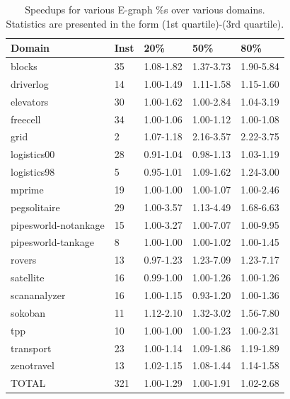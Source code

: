 \documentclass[letterpaper]{article}
\begin{document}
\begin{table}
	\begin{center}
	    \begin{tabular}{| l | l | l | l | l |}
	    \hline
	    Domain & Inst & 20\% & 50\% & 80\%
	    \\ \hline
	    blocks & 35 & 1.08-1.82 & 1.37-3.73 & 1.90-5.84
	    \\ \hline
	    driverlog & 14 & 1.00-1.49 & 1.11-1.58 & 1.15-1.60
	    \\ \hline
	    elevators & 30 & 1.00-1.62 & 1.00-2.84 & 1.04-3.19
	    \\ \hline
	    freecell & 34 & 1.00-1.06 & 1.00-1.12 & 1.00-1.08
	    \\ \hline
	    grid & 2 & 1.07-1.18 & 2.16-3.57 & 2.22-3.75
	    \\ \hline
	    logistics00 & 28 & 0.91-1.04 & 0.98-1.13 & 1.03-1.19
	    \\ \hline
	    logistics98 & 5 & 0.95-1.01 & 1.09-1.62 & 1.24-3.00
	    \\ \hline
	    mprime & 19 & 1.00-1.00 & 1.00-1.07 & 1.00-2.46
	    \\ \hline
	    pegsolitaire & 29 & 1.00-3.57 & 1.13-4.49 & 1.68-6.63
	    \\ \hline
	    pipesworld-notankage & 15 & 1.00-3.27 & 1.00-7.07 & 1.00-9.95
	    \\ \hline
	    pipesworld-tankage & 8 & 1.00-1.00 & 1.00-1.02 & 1.00-1.45
	    \\ \hline
	    rovers & 13 & 0.97-1.23 & 1.23-7.09 & 1.23-7.17
	    \\ \hline
	    satellite & 16 & 0.99-1.00 & 1.00-1.26 & 1.00-1.26
	    \\ \hline
	    scananalyzer & 16 & 1.00-1.15 & 0.93-1.20 & 1.00-1.36
	    \\ \hline
	    sokoban & 11 & 1.12-2.10 & 1.32-3.02 & 1.56-7.80
	    \\ \hline
	    tpp & 10 & 1.00-1.00 & 1.00-1.23 & 1.00-2.31
	    \\ \hline
	    transport & 23 & 1.00-1.14 & 1.09-1.86 & 1.19-1.89
	    \\ \hline
	    zenotravel & 13 & 1.02-1.15 & 1.08-1.44 & 1.14-1.58
	    \\ \hline
	    TOTAL & 321 & 1.00-1.29 & 1.00-1.91 & 1.02-2.68
	    \\ \hline
	    \end{tabular}
	\end{center}
	\caption{Speedups for various E-graph \%s over various domains. Statistics are presented in the form (1st quartile)-(3rd quartile).}
	 \label{tab:percent}
\end{table}
\end{document}
